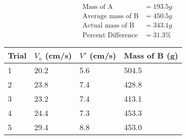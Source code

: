 \begin{equation*}
    \begin{aligned}
        \text{Mass of A}&=193.5g \\
        \text{Average mass of B}&=450.5g \\
        \text{Actual mass of B}&=343.1g \\
        \text{Percent Difference}&=31.3\%
    \end{aligned}
\end{equation*}
\begin{table}[H]
    \begin{tabular}{|l|l|l|l|}
    \hline
    Trial & $V_a$ (cm/s) & $V'$ (cm/s) & Mass of B (g) \\ \hline
    1     & 20.2        & 5.6       & 504.5         \\ \hline
    2     & 23.8        & 7.4       & 428.8         \\ \hline
    3     & 23.2        & 7.4       & 413.1         \\ \hline
    4     & 24.4        & 7.3       & 453.3         \\ \hline
    5     & 29.4        & 8.8       & 453.0         \\ \hline
    \end{tabular}
    \end{table}
    
